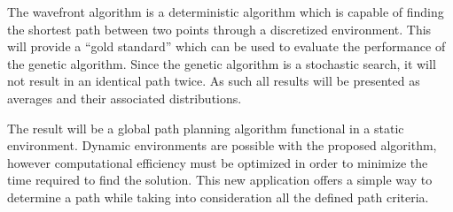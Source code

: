 The wavefront algorithm is a deterministic algorithm which is capable of finding the shortest path between two points through a discretized environment. This will provide a ``gold standard'' which can be used to evaluate the performance of the genetic algorithm. Since the genetic algorithm is a stochastic search, it will not result in an identical path twice. As such all results will be presented as averages and their associated distributions.

The result will be a global path planning algorithm functional in a static environment. Dynamic environments are possible with the proposed algorithm, however computational efficiency must be optimized in order to minimize the time required to find the solution. This new application offers a simple way to determine a path while taking into consideration all the defined path criteria.
